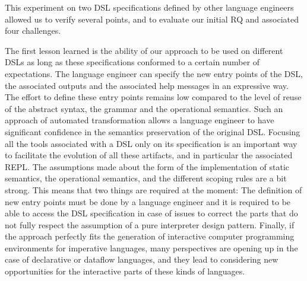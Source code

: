 This experiment on two DSL specifications defined by other language engineers allowed us to verify several points, and to evaluate our initial RQ and associated four challenges. 

The first lesson learned is the ability of our approach to be used on different DSLs as long as these specifications conformed to a certain number of expectations. The language engineer can specify the new entry points of the DSL, the associated outputs and the associated help messages in an expressive way. The effort to define these entry points remains low compared to the level of reuse of the abstract syntax, the grammar and the operational semantics. 
Such an approach of automated transformation allows a language engineer to have significant confidence in the semantics preservation of the original DSL. Focusing all the tools associated with a DSL only on its specification is an important way to facilitate the evolution of all these artifacts, and in particular the associated REPL. 
The assumptions made about the form of the implementation of static semantics, the operational semantics, and the different scoping rules are a bit strong. This means that two things are required at the moment: The definition of new entry points must be done by a language engineer and it is required to be able to access the DSL specification in case of issues to correct the parts that do not fully respect the assumption of a pure interpreter design pattern. Finally, if the approach perfectly fits the generation of interactive computer programming environments for imperative languages, many perspectives are opening up in the case of declarative or dataflow languages, and they lead to considering new opportunities for the interactive parts of these kinds of languages. 






